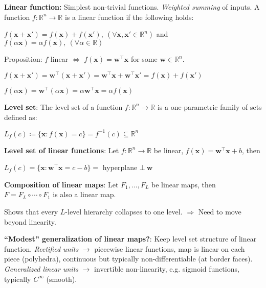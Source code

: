         \textbf{Linear function:} Simplest non-trivial functions. \emph{Weighted summing} of inputs. A function $f:\mathbb{R}^n\xrightarrow{}\mathbb{R}$ is a linear function if the following holds:
        
        \tab$f(\mathbf{x}+\mathbf{x'})=f(\mathbf{x})+f(\mathbf{x'}),\>(\forall\mathbf{x},\mathbf{x'}\in\mathbb{R}^n)$ and
        $f(\alpha\mathbf{x})=\alpha f(\mathbf{x}), \>(\forall\alpha\in\mathbb{R})$
        
        Proposition: $f$ linear $\Leftrightarrow$ $f(\mathbf{x})=\mathbf{w}^\top \mathbf{x}$ for some $\mathbf{w}\in\mathbb{R}^n$.
        
        \tab$f(\mathbf{x}+\mathbf{x'})=\mathbf{w}^\top(\mathbf{x}+\mathbf{x'})=\mathbf{w}^\top\mathbf{x}+\mathbf{w}^\top\mathbf{x'}=f(\mathbf{x})+f(\mathbf{x'})$
        
        \tab$f(\alpha\mathbf{x})=\mathbf{w}^\top(\alpha\mathbf{x})=\alpha\mathbf{w}^\top\mathbf{x}=\alpha f(\mathbf{x})$
        
        
        \textbf{Level set}: The level set of a function $f:\mathbb{R}^n\xrightarrow{}\mathbb{R}$ is a one-parametric family of sets defined as:
        
        \tab$L_f(c)\coloneqq\{\mathbf{x}:f(\mathbf{x})=c\}=f^{-1}(c)\subseteq\mathbb{R}^n$
        
        \textbf{Level set of linear functions}:
        Let $f:\mathbb{R}^n\xrightarrow{}\mathbb{R}$ be linear, $f(\mathbf{x})=\mathbf{w}^\top\mathbf{x}+b$, then
        
        \tab$L_f(c)=\{\mathbf{x}:\mathbf{w}^\top\mathbf{x}=c-b\}=$ hyperplane $\bot\:\mathbf{w}$
        
        \textbf{Composition of linear maps}: Let $F_1,\ldots,F_L$ be linear maps, then $F=F_L\circ\cdots\circ F_1$ is also a linear map.
        
        
        Shows that every $L$-level hierarchy collapses to one level. $\Rightarrow$ Need to move beyond linearity.
        
        \textbf{``Modest'' generalization of linear maps?}: Keep level set structure of linear function. \emph{Rectified units} $\xrightarrow{}$ piecewise linear functions, map is linear on each piece (polyhedra), continuous but typically non-differentiable (at border faces). \emph{Generalized linear units} $\xrightarrow{}$ invertible non-linearity, e.g. sigmoid functions, typically $C^\infty$ (smooth).
        
        

